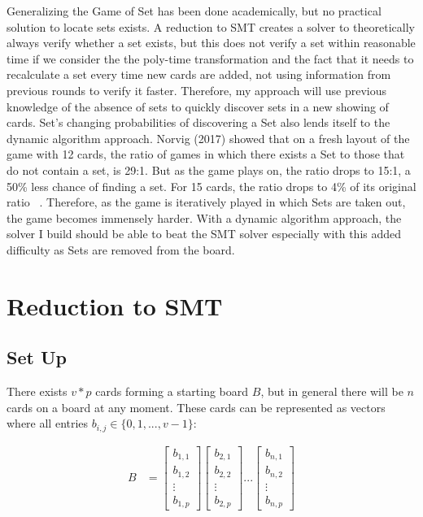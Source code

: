 \documentclass[pageno]{jpaper}
\begin{document}
Generalizing the Game of Set has been done academically, but no practical solution to locate sets exists. A reduction to SMT creates a solver to theoretically always verify whether a set exists, but this does not verify a set within reasonable time if we consider the the poly-time transformation and the fact that it needs to recalculate a set every time new cards are added, not using information from previous rounds to verify it faster. Therefore, my approach will use previous knowledge of the absence of sets to quickly discover sets in a new showing of cards. Set's changing probabilities of discovering a Set also lends itself to the dynamic algorithm approach. Norvig (2017) showed that on a fresh layout of the game with 12 cards, the ratio of games in which there exists a Set to those that do not contain a set, is 29:1. But as the game plays on, the ratio drops to 15:1, a 50\% less chance of finding a set. For 15 cards, the ratio drops to 4\% of its original ratio ~\cite{norvig}. Therefore, as the game is iteratively played in which Sets are taken out, the game becomes immensely harder. With a dynamic algorithm approach, the solver I build should be able to beat the SMT solver especially with this added difficulty as Sets are removed from the board. 


\section{Reduction to SMT}

\subsection{Set Up}

There exists $v*p$ cards forming a starting board $B$, but in general there will be $n$ cards on a board at any moment. These cards can be represented as vectors where all entries $b_{i,j} \in \{0,1, ... , v-1\}$:

\begin{align}
    B &= \begin{bmatrix}
           b_{1,1} \\
           b_{1,2} \\
           \vdots \\
           b_{1,p}
         \end{bmatrix}
         \begin{bmatrix}
           b_{2,1} \\
           b_{2,2} \\
           \vdots \\
           b_{2,p}
         \end{bmatrix} ... 
          \begin{bmatrix}
           b_{n,1} \\
           b_{n,2} \\
           \vdots \\
           b_{n,p}
         \end{bmatrix}
  \end{align}
  
\end{document}
